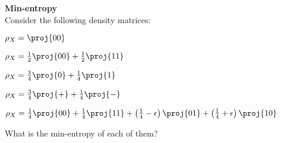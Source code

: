 \begin{exercises}
\item{\bf Min-entropy}\\
Consider the following density matrices:
\begin{statements}
\item $\rho_X = \proj{00}$
\item $\rho_X = \frac{1}{2}\proj{00} + \frac{1}{2}\proj{11}$
\item $\rho_X = \frac{3}{4}\proj{0} + \frac{1}{4}\proj{1}$
\item $\rho_X = \frac{3}{4}\proj{+} + \frac{1}{4}\proj{-}$
\item $\rho_X = \frac{1}{4}\proj{00} + \frac{1}{4}\proj{11} + \left(\frac{1}{4} - \epsilon\right) \proj{01}  + \left(\frac{1}{4} + \epsilon\right) \proj{10}$
\end{statements}
 What is the min-entropy of each of them?


\end{exercises}
